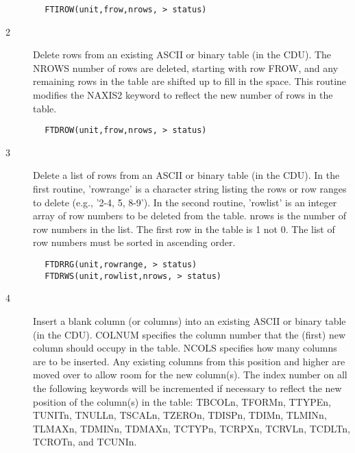 \documentclass[11pt]{book}
\begin{document}
\begin{verbatim}
        FTIROW(unit,frow,nrows, > status)
\end{verbatim}

\begin{description}
\item[2 ] Delete rows from an existing ASCII or binary table (in the CDU).
    The NROWS number of rows are deleted, starting with row FROW, and
    any remaining rows in the table are shifted up to fill in the space.
    This routine modifies the NAXIS2 keyword to reflect the new number
   of rows in the table.
\end{description}

\begin{verbatim}
        FTDROW(unit,frow,nrows, > status)
\end{verbatim}

\begin{description}
\item[3 ] Delete a list of rows from an ASCII or binary table (in the CDU).
    In the first routine, 'rowrange' is a character string listing the
    rows or row ranges to delete (e.g., '2-4, 5, 8-9'). In the second
    routine, 'rowlist' is an integer array of row numbers to be deleted
    from the table.  nrows is the number of row numbers in the list.
    The first row in the table is 1 not 0.  The list of row numbers
   must be sorted in ascending order.
\end{description}

\begin{verbatim}
        FTDRRG(unit,rowrange, > status)
        FTDRWS(unit,rowlist,nrows, > status)
\end{verbatim}

\begin{description}
\item[4 ] Insert a blank column (or columns) into an existing ASCII or binary
    table (in the CDU).  COLNUM specifies the column number that the (first)
    new column should occupy in the table.  NCOLS specifies how many
    columns are to be inserted. Any existing columns from this position and
    higher are moved over to allow room for the new column(s).
    The index number on all the following keywords will be incremented
    if necessary to reflect the new position of the column(s) in the table:
    TBCOLn, TFORMn, TTYPEn, TUNITn, TNULLn, TSCALn, TZEROn, TDISPn, TDIMn,
    TLMINn, TLMAXn, TDMINn, TDMAXn, TCTYPn, TCRPXn, TCRVLn, TCDLTn, TCROTn,
   and TCUNIn.
\end{description}
\end{document}
